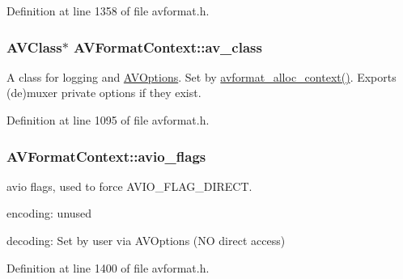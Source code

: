 Definition at line 1358 of file avformat.\+h.

\subsubsection[{\texorpdfstring{av\+\_\+class}{av_class}}]{ {\bf A\+V\+Class}$\ast$ A\+V\+Format\+Context\+::av\+\_\+class}\hypertarget{struct_a_v_format_context_a0c396740b9a2487aa57d4352d2dc1687}{}\label{struct_a_v_format_context_a0c396740b9a2487aa57d4352d2dc1687}
A class for logging and \hyperlink{group__avoptions}{A\+V\+Options}. Set by \hyperlink{group__lavf__core_gac7a91abf2f59648d995894711f070f62}{avformat\+\_\+alloc\+\_\+context()}. Exports (de)muxer private options if they exist. 

Definition at line 1095 of file avformat.\+h.

\subsubsection[{\texorpdfstring{avio\+\_\+flags}{avio_flags}}]{ A\+V\+Format\+Context\+::avio\+\_\+flags}\hypertarget{struct_a_v_format_context_a5e6814c9de3c272396f07e2ff18c7b27}{}\label{struct_a_v_format_context_a5e6814c9de3c272396f07e2ff18c7b27}
avio flags, used to force A\+V\+I\+O\+\_\+\+F\+L\+A\+G\+\_\+\+D\+I\+R\+E\+CT.
\begin{DoxyItemize}
\item encoding\+: unused
\item decoding\+: Set by user via A\+V\+Options (NO direct access) 
\end{DoxyItemize}

Definition at line 1400 of file avformat.\+h.

